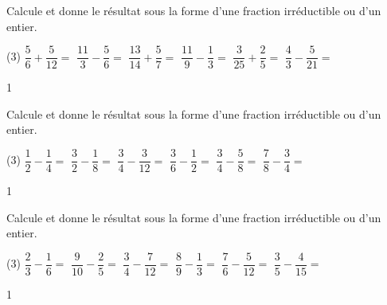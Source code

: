 \documentclass[a4paper,11pt]{report}
\begin{document}
\begin{exo}
{Calcule et donne le résultat sous la forme d'une fraction irréductible ou d'un entier. 

\begin{tasks}(3)
 \task $\dfrac{5}{6}+\dfrac{5}{12}=$
  \task $\dfrac{11}{3}-\dfrac{5}{6}=$
 \task $\dfrac{13}{14}+\dfrac{5}{7}=$
  \task $\dfrac{11}{9}-\dfrac{1}{3}=$  
  \task $\dfrac{3}{25}+\dfrac{2}{5}=$  
  \task $\dfrac{4}{3}-\dfrac{5}{21}=$  
\end{tasks}    
}{1}
\end{exo}

\begin{exo}
{Calcule et donne le résultat sous la forme d'une fraction irréductible ou d'un entier.

\begin{tasks}(3)
\task $\dfrac{1}{2}-\dfrac{1}{4}=$
\task $\dfrac{3}{2}-\dfrac{1}{8}=$
\task $\dfrac{3}{4}-\dfrac{3}{12}=$
\task $\dfrac{3}{6}-\dfrac{1}{2}=$
\task $\dfrac{3}{4}-\dfrac{5}{8}=$
\task $\dfrac{7}{8}-\dfrac{3}{4}=$
\end{tasks}}
{1}
\end{exo}

\begin{exo}
{Calcule et donne le résultat sous la forme d'une fraction irréductible ou d'un entier.

\begin{tasks}(3)
\task $\dfrac{2}{3}-\dfrac{1}{6}=$
\task $\dfrac{9}{10}-\dfrac{2}{5}=$
\task $\dfrac{3}{4}-\dfrac{7}{12}=$
\task $\dfrac{8}{9}-\dfrac{1}{3}=$
\task $\dfrac{7}{6}-\dfrac{5}{12}=$
\task $\dfrac{3}{5}-\dfrac{4}{15}=$
\end{tasks}}
{1}
\end{exo}
\end{document}
